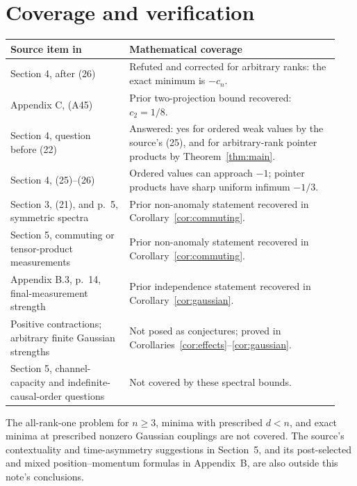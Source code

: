 \documentclass[11pt,a4paper]{article}
\begin{document}
\section{Coverage and verification}

\begin{center}\small
\begin{tabular}{@{}>{\raggedright\arraybackslash}p{0.34\linewidth}>{\raggedright\arraybackslash}p{0.60\linewidth}@{}}
\toprule
Source item in \cite{abbott} & Mathematical coverage\\
\midrule
Section 4, after (26) & Refuted and corrected for arbitrary ranks:
the exact minimum is $-c_n$.\\
Appendix C, (A45) & Prior two-projection bound recovered:
$c_2=1/8$.\\
Section 4, question before (22) & Answered: yes for ordered weak values
by the source's (25), and for arbitrary-rank pointer products by
Theorem~\ref{thm:main}.\\
Section 4, (25)--(26) & Ordered values can approach $-1$;
pointer products have sharp uniform infimum $-1/3$.\\
Section 3, (21), and p.~5, symmetric spectra & Prior non-anomaly
statement recovered in Corollary~\ref{cor:commuting}.\\
Section 5, commuting or tensor-product measurements & Prior non-anomaly
statement recovered in Corollary~\ref{cor:commuting}.\\
Appendix B.3, p.~14, final-measurement strength & Prior independence
statement recovered in Corollary~\ref{cor:gaussian}.\\
Positive contractions; arbitrary finite Gaussian strengths & Not posed
as conjectures; proved in Corollaries~\ref{cor:effects}--\ref{cor:gaussian}.\\
Section 5, channel-capacity and indefinite-causal-order questions & Not covered
by these spectral bounds.\\
\bottomrule
\end{tabular}
\end{center}
The all-rank-one problem for $n\geq3$, minima with prescribed $d<n$,
and exact minima at prescribed nonzero Gaussian couplings are not covered.
The source's contextuality and time-asymmetry suggestions in Section~5,
and its post-selected and mixed position--momentum formulas in
Appendix~B, are also outside this note's conclusions.
\end{document}
